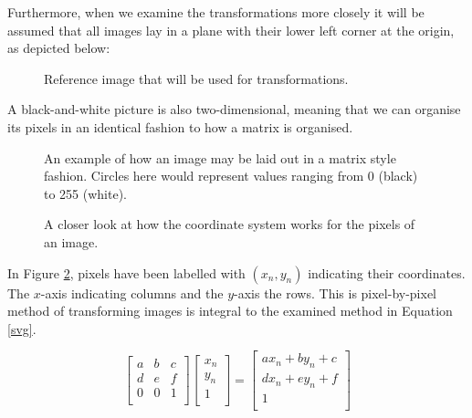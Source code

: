 \documentclass{article}
\begin{document}
Furthermore, when we examine the transformations more closely it will be assumed
that all images lay in a plane with their lower left corner at the origin, as 
depicted below:

\begin{figure}[!htbp]
    \centering
    \caption{Reference image that will be used for transformations.}
\end{figure}


A black-and-white picture is also two-dimensional, meaning that we can organise its 
pixels in an identical fashion to how a matrix is organised.

\begin{figure}[!htbp]
    \centering
    \caption{An example of how an image may be laid out in a matrix style
    fashion. Circles here would represent values ranging from 0 (black) to 255
    (white).}
    \label{grid}
\end{figure}

\begin{figure}[!htbp]
    \centering
    \caption{A closer look at how the coordinate system works for the pixels of
    an image.}
    \label{pixels}
\end{figure}

In Figure \ref{pixels}, pixels have been labelled with $ (x_n, y_n)  $ indicating
their coordinates. The $ x $-axis indicating columns and the $ y $-axis the
rows. This is pixel-by-pixel method of transforming images is integral to the
examined method in Equation \ref{svg}.


\begin{equation}
    \begin{bmatrix}
        a & b & c \\
		d & e & f \\
		0 & 0 & 1 \\	
    \end{bmatrix}
    \begin{bmatrix}
        x_n  \\
		y_n  \\
		1 \\		
    \end{bmatrix}
    =
    \begin{bmatrix}
        ax_n  + by_n + c \\
		dx_n + ey_n  + f \\
		1 \\		    
    \end{bmatrix}
    \label{svg}
\end{equation}
\end{document}
